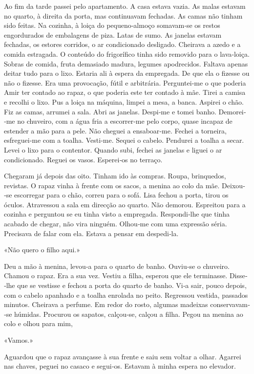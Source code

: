 Ao fim da tarde passei pelo apartamento. A casa estava vazia. As malas
estavam no quarto, à direita da porta, mas continuavam fechadas. As
camas não tinham sido feitas. Na cozinha, à loiça do pequeno­‑almoço
somavam­‑se os restos engordurados de embalagens de piza. Latas de sumo.
As janelas estavam fechadas, os estores corridos, o ar condicionado
desligado. Cheirava a azedo e a comida estragada. O conteúdo do
frigorífico tinha sido removido para o lava­‑loiça. Sobras de comida,
fruta demasiado madura, legumes apodrecidos. Faltava apenas deitar tudo
para o lixo. Estaria ali à espera da empregada. De que ela o fizesse ou
não o fizesse. Era uma provocação, fútil e arbitrária. Perguntei­‑me o
que poderia Amir ter contado ao rapaz, o que poderia este ter contado à
mãe. Tirei a camisa e recolhi o lixo. Pus a loiça na máquina, limpei a
mesa, a banca. Aspirei o chão. Fiz as camas, arrumei a sala. Abri as
janelas. Despi­‑me e tomei banho. Demorei­‑me no chuveiro, com a água
fria a escorrer­‑me pelo corpo, quase incapaz de estender a mão para a
pele. Não cheguei a ensaboar­‑me. Fechei a torneira, esfreguei­‑me com a
toalha. Vesti­‑me. Sequei o cabelo. Pendurei a toalha a secar. Levei o
lixo para o contentor. Quando subi, fechei as janelas e liguei o ar
condicionado. Reguei os vasos. Esperei­‑os no terraço.

Chegaram já depois das oito. Tinham ido às compras. Roupa, brinquedos,
revistas. O rapaz vinha à frente com os sacos, a menina ao colo da mãe.
Deixou­‑se escorregar para o chão, correu para o sofá. Lisa fechou a
porta, tirou os óculos. Atravessou a sala em direcção ao quarto. Não
demorou. Espreitou para a cozinha e perguntou se eu tinha visto a
empregada. Respondi­‑lhe que tinha acabado de chegar, não vira ninguém.
Olhou­‑me com uma expressão séria. Precisava de falar com ela. Estava a
pensar em despedi­‑la.

«Não quero o filho aqui.»

Deu a mão à menina, levou­‑a para o quarto de banho. Ouviu­‑se o
chuveiro. Chamou o rapaz. Era a sua vez. Vestiu a filha, esperou que ele
terminasse. Disse­‑lhe que se vestisse e fechou a porta do quarto de
banho. Vi­‑a sair, pouco depois, com o cabelo apanhado e a toalha
enrolada no peito. Regressou vestida, passados minutos. Cheirava a
perfume. Em redor do rosto, algumas madeixas conservavam­‑se húmidas.
Procurou os sapatos, calçou­‑se, calçou a filha. Pegou na menina ao colo
e olhou para mim,

«Vamos.»

Aguardou que o rapaz avançasse à sua frente e saiu sem voltar a olhar.
Agarrei nas chaves, peguei no casaco e segui­‑os. Estavam à minha espera
no elevador.

